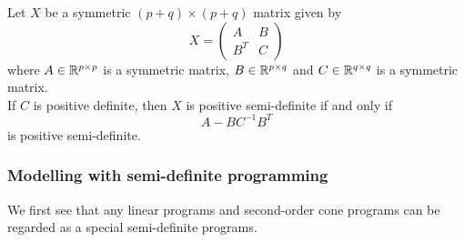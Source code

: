Let \(X\) be a symmetric \((p + q) \times (p + q)\) matrix given by
\[X = \begin{pmatrix}
        A & B \\ B^T & C
    \end{pmatrix}
\]
where \(A \in \mathbb{R}^{p \times p}\) is a symmetric matrix, \(B \in \mathbb{R}^{p \times q}\) and \(C \in \mathbb{R}^{q \times q}\) is a symmetric matrix. \\

If \(C\) is positive definite, then \(X\) is positive semi-definite if and only if
\[A - BC^{-1}B^T\]
is positive semi-definite.

\subsubsection{Modelling with semi-definite programming}

We first see that any linear programs and second-order cone programs can be regarded as a special semi-definite programs.

